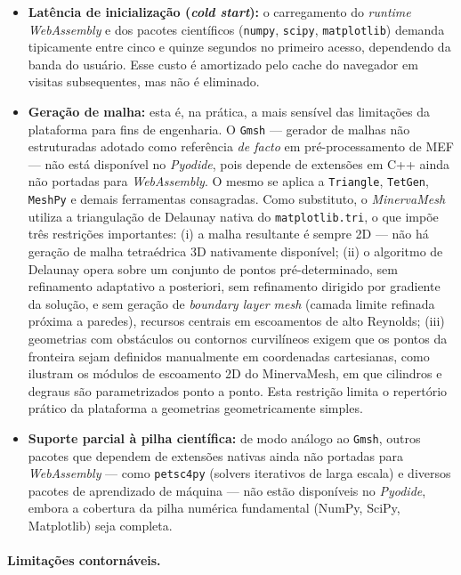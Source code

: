 \begin{itemize}
    \item \textbf{Latência de inicialização (\textit{cold start}):} o carregamento do \textit{runtime} \textit{WebAssembly} e dos pacotes científicos (\texttt{numpy}, \texttt{scipy}, \texttt{matplotlib}) demanda tipicamente entre cinco e quinze segundos no primeiro acesso, dependendo da banda do usuário. Esse custo é amortizado pelo cache do navegador em visitas subsequentes, mas não é eliminado.

    \item \textbf{Geração de malha:} esta é, na prática, a mais sensível das limitações da plataforma para fins de engenharia. O \texttt{Gmsh} --- gerador de malhas não estruturadas adotado como referência \textit{de facto} em pré-processamento de MEF --- não está disponível no \textit{Pyodide}, pois depende de extensões em C++ ainda não portadas para \textit{WebAssembly}. O mesmo se aplica a \texttt{Triangle}, \texttt{TetGen}, \texttt{MeshPy} e demais ferramentas consagradas. Como substituto, o \textit{MinervaMesh} utiliza a triangulação de Delaunay nativa do \texttt{matplotlib.tri}, o que impõe três restrições importantes: (i) a malha resultante é sempre 2D --- não há geração de malha tetraédrica 3D nativamente disponível; (ii) o algoritmo de Delaunay opera sobre um conjunto de pontos pré-determinado, sem refinamento adaptativo a posteriori, sem refinamento dirigido por gradiente da solução, e sem geração de \textit{boundary layer mesh} (camada limite refinada próxima a paredes), recursos centrais em escoamentos de alto Reynolds; (iii) geometrias com obstáculos ou contornos curvilíneos exigem que os pontos da fronteira sejam definidos manualmente em coordenadas cartesianas, como ilustram os módulos de escoamento 2D do MinervaMesh, em que cilindros e degraus são parametrizados ponto a ponto. Esta restrição limita o repertório prático da plataforma a geometrias geometricamente simples.

    \item \textbf{Suporte parcial à pilha científica:} de modo análogo ao \texttt{Gmsh}, outros pacotes que dependem de extensões nativas ainda não portadas para \textit{WebAssembly} --- como \texttt{petsc4py} (solvers iterativos de larga escala) e diversos pacotes de aprendizado de máquina --- não estão disponíveis no \textit{Pyodide}, embora a cobertura da pilha numérica fundamental (NumPy, SciPy, Matplotlib) seja completa.
\end{itemize}

\paragraph{Limitações contornáveis.}


